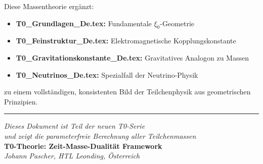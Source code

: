 \documentclass[12pt,a4paper]{article}
\begin{document}
	Diese Massentheorie ergänzt:
	\begin{itemize}
		\item \textbf{T0\_Grundlagen\_De.tex:} Fundamentale $\xi_0$-Geometrie
		\item \textbf{T0\_Feinstruktur\_De.tex:} Elektromagnetische Kopplungskonstante
		\item \textbf{T0\_Gravitationskonstante\_De.tex:} Gravitatives Analogon zu Massen
		\item \textbf{T0\_Neutrinos\_De.tex:} Spezialfall der Neutrino-Physik
	\end{itemize}
	
	zu einem vollständigen, konsistenten Bild der Teilchenphysik aus geometrischen Prinzipien.
	
	\begin{center}
		\hrule
		\vspace{0.5cm}
		\textit{Dieses Dokument ist Teil der neuen T0-Serie}\\
		\textit{und zeigt die parameterfreie Berechnung aller Teilchenmassen}\\
		\vspace{0.3cm}
		\textbf{T0-Theorie: Zeit-Masse-Dualität Framework}\\
		\textit{Johann Pascher, HTL Leonding, Österreich}\\
	\end{center}
	
\end{document}
